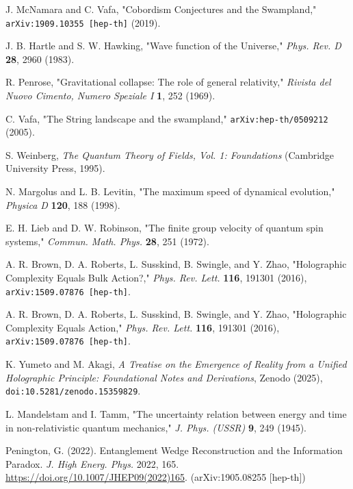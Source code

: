 \documentclass[11pt, letterpaper]{report}
\theoremstyle{plain} %
\theoremstyle{definition} %
\theoremstyle{remark} %
\begin{document}
\begin{thebibliography}{99}
J. McNamara and C. Vafa, "Cobordism Conjectures and the Swampland," \texttt{arXiv:1909.10355 [hep-th]} (2019).

J. B. Hartle and S. W. Hawking, "Wave function of the Universe," \textit{Phys. Rev. D} \textbf{28}, 2960 (1983).

R. Penrose, "Gravitational collapse: The role of general relativity," \textit{Rivista del Nuovo Cimento, Numero Speziale I} \textbf{1}, 252 (1969).

C. Vafa, "The String landscape and the swampland," \texttt{arXiv:hep-th/0509212} (2005).

S. Weinberg, \textit{The Quantum Theory of Fields, Vol. 1: Foundations} (Cambridge University Press, 1995).

\label{MargolusLevitin1998}
N. Margolus and L. B. Levitin, "The maximum speed of dynamical evolution," \textit{Physica D} \textbf{120}, 188 (1998).

\label{LiebRobinson1972}
E. H. Lieb and D. W. Robinson, "The finite group velocity of quantum spin systems," \textit{Commun. Math. Phys.} \textbf{28}, 251 (1972).

\label{BrownEtAl2016Action}
A. R. Brown, D. A. Roberts, L. Susskind, B. Swingle, and Y. Zhao, "Holographic Complexity Equals Bulk Action?," \textit{Phys. Rev. Lett.} \textbf{116}, 191301 (2016), \texttt{arXiv:1509.07876 [hep-th]}.

A. R. Brown, D. A. Roberts, L. Susskind, B. Swingle, and Y. Zhao, "Holographic Complexity Equals Action," \textit{Phys. Rev. Lett.} \textbf{116}, 191301 (2016), \texttt{arXiv:1509.07876 [hep-th]}.

\label{Yumeto_Akagi_2025}
K. Yumeto and M. Akagi, \textit{A Treatise on the Emergence of Reality from a Unified Holographic Principle: Foundational Notes and Derivations}, Zenodo (2025), \texttt{doi:10.5281/zenodo.15359829}.

\label{MandelstamTamm1945}
L. Mandelstam and I. Tamm, "The uncertainty relation between energy and time in non-relativistic quantum mechanics," \textit{J. Phys. (USSR)} \textbf{9}, 249 (1945).

\label{Penington2019EntanglementWedge}
Penington, G. (2022). Entanglement Wedge Reconstruction and the Information Paradox. \textit{J. High Energ. Phys.} 2022, 165. \href{https://doi.org/10.1007/JHEP09(2022)165}{https://doi.org/10.1007/JHEP09(2022)165}. (arXiv:1905.08255 [hep-th])


\end{thebibliography}
\end{document}
